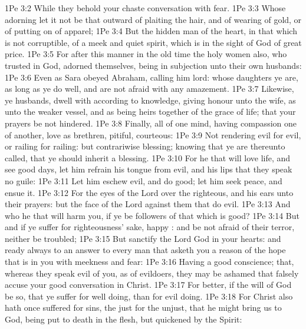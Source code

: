 \vs 1Pe 3:2 While they behold your chaste conversation  with fear.
\vs 1Pe 3:3 Whose adorning let it not be that outward  of plaiting the hair, and of wearing of gold, or of putting on of apparel;
\vs 1Pe 3:4 But  the hidden man of the heart, in that which is not corruptible,  of a meek and quiet spirit, which is in the sight of God of great price.
\vs 1Pe 3:5 For after this manner in the old time the holy women also, who trusted in God, adorned themselves, being in subjection unto their own husbands:
\vs 1Pe 3:6 Even as Sara obeyed Abraham, calling him lord: whose daughters ye are, as long as ye do well, and are not afraid with any amazement.
\vs 1Pe 3:7 Likewise, ye husbands, dwell with  according to knowledge, giving honour unto the wife, as unto the weaker vessel, and as being heirs together of the grace of life; that your prayers be not hindered.
\vs 1Pe 3:8 Finally,  all of one mind, having compassion one of another, love as brethren,  pitiful,  courteous:
\vs 1Pe 3:9 Not rendering evil for evil, or railing for railing: but contrariwise blessing; knowing that ye are thereunto called, that ye should inherit a blessing.
\vs 1Pe 3:10 For he that will love life, and see good days, let him refrain his tongue from evil, and his lips that they speak no guile:
\vs 1Pe 3:11 Let him eschew evil, and do good; let him seek peace, and ensue it.
\vs 1Pe 3:12 For the eyes of the Lord  over the righteous, and his ears  unto their prayers: but the face of the Lord  against them that do evil.
\vs 1Pe 3:13 And who  he that will harm you, if ye be followers of that which is good?
\vs 1Pe 3:14 But and if ye suffer for righteousness' sake, happy : and be not afraid of their terror, neither be troubled;
\vs 1Pe 3:15 But sanctify the Lord God in your hearts: and  ready always to  an answer to every man that asketh you a reason of the hope that is in you with meekness and fear:
\vs 1Pe 3:16 Having a good conscience; that, whereas they speak evil of you, as of evildoers, they may be ashamed that falsely accuse your good conversation in Christ.
\vs 1Pe 3:17 For  better, if the will of God be so, that ye suffer for well doing, than for evil doing.
\vs 1Pe 3:18 For Christ also hath once suffered for sins, the just for the unjust, that he might bring us to God, being put to death in the flesh, but quickened by the Spirit:
